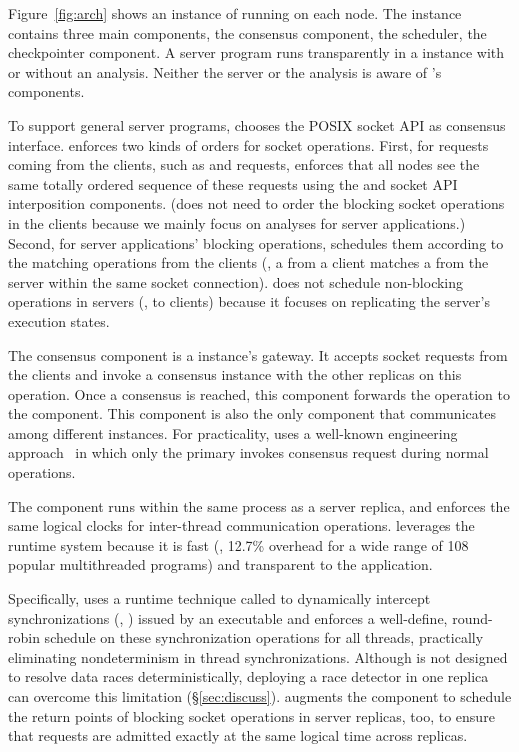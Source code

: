 Figure~\ref{fig:arch} shows an instance of \xxx running on 
each node. The instance contains three main components, the \paxos consensus 
component, the \dmt scheduler, the checkpointer component. A server program 
runs transparently in a \xxx instance with or without an analysis. Neither the 
server or the analysis is aware of \xxx's components.

To support general server programs, \xxx chooses the POSIX socket API as
consensus interface. \xxx enforces two kinds of orders for socket
operations.  First, for requests coming from the clients, such as \connect and
\send requests, \xxx enforces that all nodes see the same totally ordered
sequence of these requests using the \paxos and socket API interposition
components.  (\xxx does not need to order the blocking socket operations
in the clients because we mainly focus on analyses for server applications.) 
Second, for server applications' blocking operations, \xxx schedules them 
according to the matching operations from the clients (\eg, a \send from a 
client matches a \recv from the server within the same socket connection). \xxx 
does not schedule non-blocking operations in servers (\eg, \send to 
clients) because it focuses on replicating the server's execution states.


The \paxos consensus component is a \xxx instance's gateway.  It accepts socket
requests from the clients and invoke a \paxos consensus instance with the other 
replicas on this operation. Once a consensus is reached, this component 
forwards the operation to the \dmt component. This component is also the only 
\xxx 
component that communicates among different \xxx instances. For practicality, 
\xxx uses a well-known \paxos engineering approach~\cite{paxos:practical} in 
which only the primary invokes consensus request during normal operations.


The \dmt component runs within the same process as a server replica, and
enforces the same logical clocks for inter-thread communication
operations. \xxx leverages the \parrot~\cite{parrot:sosp13} \dmt runtime
system because it is fast (\ie, 12.7\% overhead for a wide range of 108 popular 
multithreaded programs) and transparent to the application.


Specifically, \parrot uses a runtime technique called \ldpreload to dynamically 
intercept \pthread synchronizations (\eg, \mutexlock) issued by an executable 
and enforces a well-define, round-robin schedule on these synchronization 
operations for all threads, practically eliminating nondeterminism in thread
synchronizations. Although \parrot is not designed to resolve data races
deterministically, deploying a race detector in one replica can overcome this 
limitation (\S\ref{sec:discuss}).  \xxx augments the \dmt component to schedule 
the return points of blocking socket operations in server replicas, too, to 
ensure that requests are admitted exactly at the same logical time across 
replicas.


